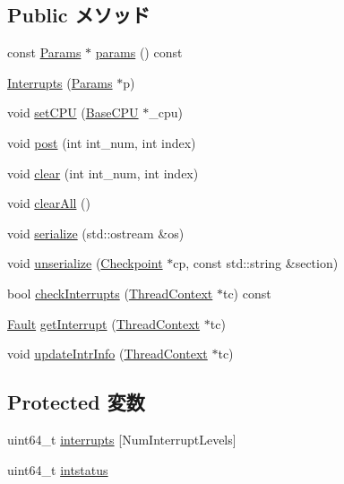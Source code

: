 \subsection*{Public メソッド}
\begin{DoxyCompactItemize}
\item 
const \hyperlink{classAlphaISA_1_1Interrupts_acac734c7c124173e3940e672404775c6}{Params} $\ast$ \hyperlink{classAlphaISA_1_1Interrupts_acd3c3feb78ae7a8f88fe0f110a718dff}{params} () const 
\item 
\hyperlink{classAlphaISA_1_1Interrupts_a3d148759405b99148e0c34750966edb1}{Interrupts} (\hyperlink{classAlphaISA_1_1Interrupts_acac734c7c124173e3940e672404775c6}{Params} $\ast$p)
\item 
void \hyperlink{classAlphaISA_1_1Interrupts_a2ab8c6aed9969bc58d6aa2427d442cc4}{setCPU} (\hyperlink{classBaseCPU}{BaseCPU} $\ast$\_\-cpu)
\item 
void \hyperlink{classAlphaISA_1_1Interrupts_a24c6c4fbdc0605bcd015ce06f194e4b4}{post} (int int\_\-num, int index)
\item 
void \hyperlink{classAlphaISA_1_1Interrupts_af60c3484087379d0330467d77f6cbaae}{clear} (int int\_\-num, int index)
\item 
void \hyperlink{classAlphaISA_1_1Interrupts_a798729dca95209ecdc609807a653a2bf}{clearAll} ()
\item 
void \hyperlink{classAlphaISA_1_1Interrupts_a53e036786d17361be4c7320d39c99b84}{serialize} (std::ostream \&os)
\item 
void \hyperlink{classAlphaISA_1_1Interrupts_af22e5d6d660b97db37003ac61ac4ee49}{unserialize} (\hyperlink{classCheckpoint}{Checkpoint} $\ast$cp, const std::string \&section)
\item 
bool \hyperlink{classAlphaISA_1_1Interrupts_af3c66fb49fec598cf78aaec29d764952}{checkInterrupts} (\hyperlink{classThreadContext}{ThreadContext} $\ast$tc) const 
\item 
\hyperlink{classRefCountingPtr}{Fault} \hyperlink{classAlphaISA_1_1Interrupts_ae603c88d759977611d3bcc6e2deb61ae}{getInterrupt} (\hyperlink{classThreadContext}{ThreadContext} $\ast$tc)
\item 
void \hyperlink{classAlphaISA_1_1Interrupts_a00892e9b06edcba6c3c27454d6235100}{updateIntrInfo} (\hyperlink{classThreadContext}{ThreadContext} $\ast$tc)
\end{DoxyCompactItemize}
\subsection*{Protected 変数}
\begin{DoxyCompactItemize}
\item 
uint64\_\-t \hyperlink{classAlphaISA_1_1Interrupts_a5249af68a95b99c6e35ebbc71821efdf}{interrupts} \mbox{[}NumInterruptLevels\mbox{]}
\item 
uint64\_\-t \hyperlink{classAlphaISA_1_1Interrupts_a199d36cc1b0d5fb621a4f57b90ac2972}{intstatus}
\end{DoxyCompactItemize}
